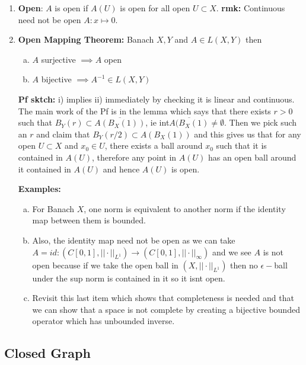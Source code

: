 \documentclass{article}
\begin{document}
\begin{enumerate}
    \item \textbf{Open}: \(A\) is open if \(A(U)\) is open for all open \(U \subset X\). \textbf{rmk:} Continuous need not be open \(A:x \mapsto 0\).
    \item \textbf{Open Mapping Theorem:} Banach \(X, Y\) and \(A \in L(X,Y)\) then 
    \begin{enumerate} [a.]
        \item \(A\) surjective \(\implies A\) open
        \item \(A\) bijective \(\implies A^{-1} \in L(X,Y)\)
    \end{enumerate}
    \textbf{Pf sktch:} i) implies ii) immediately by checking it is linear and continuous. The main work of the Pf is in the lemma which says that there exists \(r> 0\) such that \(B_Y(r) \subset \overline{A(B_X(1))}\), ie int\(\overline{A(B_X(1)} \neq \emptyset\). Then we pick such an \(r\) and claim that \(B_Y(r/2) \subset A(B_X(1))\) and this gives us that for any open \(U \subset X\) and \(x_0 \in U\), there exists a ball around \(x_0\) such that it is contained in \(A(U)\), therefore any point in \(A(U)\) has an open ball around it contained in \(A(U)\) and hence \(A(U)\) is open.
    
    \textbf{Examples:} 
    \vspace{-0.2cm}
    \begin{enumerate} [a.]
        \item For Banach \(X\), one norm is equivalent to another norm if the identity map between them is bounded.
        \item Also, the identity map need not be open as we can take \(A = id :(C[0,1], ||\cdot||_{L^1}) \to (C[0,1], ||\cdot||_{\infty})\) and we see \(A\) is not open because if we take the open ball in \((X, ||\cdot||_{L^1})\) then no \(\epsilon-\)ball under the sup norm is contained in it so it isnt open.
        \item Revisit this last item which shows that completeness is needed and that we can show that a space is not complete by creating a bijective bounded operator which has unbounded inverse.
    \end{enumerate}
\end{enumerate}

\subsection*{Closed Graph}
\end{document}
